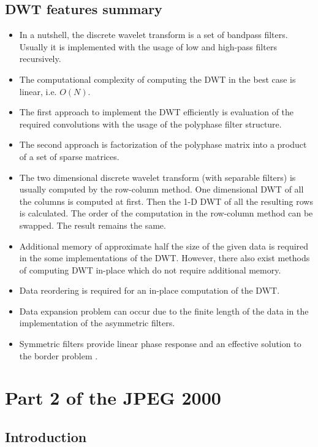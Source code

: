 \subsection{DWT features summary}

\begin{itemize}
    \item In a nutshell, the discrete wavelet transform is a set of bandpass filters. Usually it is implemented
    with the usage of low and high-pass filters recursively.
    \item The computational complexity of computing the DWT in the best case is linear, i.e. $O(N)$.
    \item The first approach to implement the DWT efficiently is evaluation of the required convolutions
    with the usage of the polyphase filter structure.
    \item The second approach is factorization of the polyphase matrix into a product of a set of sparse matrices.
    \item The two dimensional discrete wavelet transform (with separable filters) is usually computed by the row-column method.
    One dimensional DWT of all the columns is computed at first. Then the 1-D DWT of all the resulting
    rows is calculated. The order of the computation in the row-column method can be swapped. The result remains the same.
    \item Additional memory of approximate half the size of the given data is required in the some implementations of the DWT.
    However, there also exist methods of computing DWT in-place which do not require additional memory. 
    \item Data reordering is required for an in-place computation of the DWT.
    \item Data expansion problem can occur due to the finite length of the data in the implementation of the asymmetric filters.
    \item Symmetric filters provide linear phase response and an effective solution to the border problem \cite{dwt_impl}.
\end{itemize}

\section{Part 2 of the JPEG 2000} \label{sec:part2_jpeg2000}


\subsection{Introduction}

